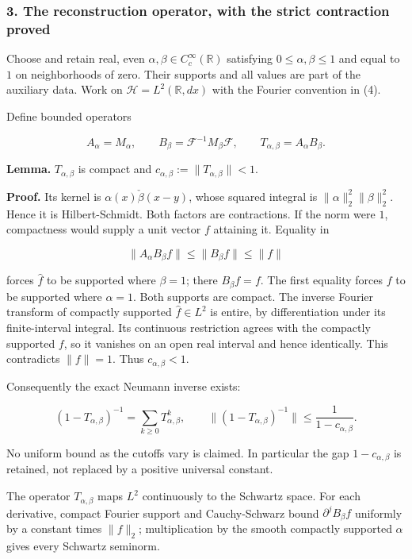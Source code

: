 \subsubsection{3. The reconstruction operator, with the strict contraction
proved}\label{pr_10:the-reconstruction-operator-with-the-strict-contraction-proved}

Choose and retain real, even \(\alpha,\beta\in C_c^\infty(\mathbb R)\) satisfying
\(0\le\alpha,\beta\le1\) and equal to \(1\) on neighborhoods of zero. Their supports and all values
are part of the auxiliary data. Work on \(\mathcal H=L^2(\mathbb R,dx)\) with the Fourier convention
in (4).

Define bounded operators

\[A_\alpha=M_\alpha,\qquad
B_\beta=\mathcal F^{-1}M_\beta\mathcal F,\qquad
T_{\alpha,\beta}=A_\alpha B_\beta.\tag{9}\]

\textbf{Lemma.} \(T_{\alpha,\beta}\) is compact and \(c_{\alpha,\beta}:=\|T_{\alpha,\beta}\|<1\).

\textbf{Proof.} Its kernel is \(\alpha(x)\check\beta(x-y)\), whose squared integral is
\(\|\alpha\|_2^2\|\beta\|_2^2\). Hence it is Hilbert-Schmidt. Both factors are contractions. If the
norm were \(1\), compactness would supply a unit vector \(f\) attaining it. Equality in

\[\|A_\alpha B_\beta f\|\le\|B_\beta f\|\le\|f\|\]

forces \(\widehat f\) to be supported where \(\beta=1\); there \(B_\beta f=f\). The first equality
forces \(f\) to be supported where \(\alpha=1\). Both supports are compact. The inverse Fourier
transform of compactly supported \(\widehat f\in L^2\) is entire, by differentiation under its
finite-interval integral. Its continuous restriction agrees with the compactly supported \(f\), so
it vanishes on an open real interval and hence identically. This contradicts \(\|f\|=1\). Thus
\(c_{\alpha,\beta}<1\).

Consequently the exact Neumann inverse exists:

\[\boxed{(1-T_{\alpha,\beta})^{-1}=\sum_{k\ge0}T_{\alpha,\beta}^k,
\qquad\|(1-T_{\alpha,\beta})^{-1}\|\le\frac1{1-c_{\alpha,\beta}}.}\tag{10}\]

No uniform bound as the cutoffs vary is claimed. In particular the gap \(1-c_{\alpha,\beta}\) is
retained, not replaced by a positive universal constant.

The operator \(T_{\alpha,\beta}\) maps \(L^2\) continuously to the Schwartz space. For each
derivative, compact Fourier support and Cauchy-Schwarz bound \(\partial^j B_\beta f\) uniformly by a
constant times \(\|f\|_2\); multiplication by the smooth compactly supported \(\alpha\) gives every
Schwartz seminorm.

